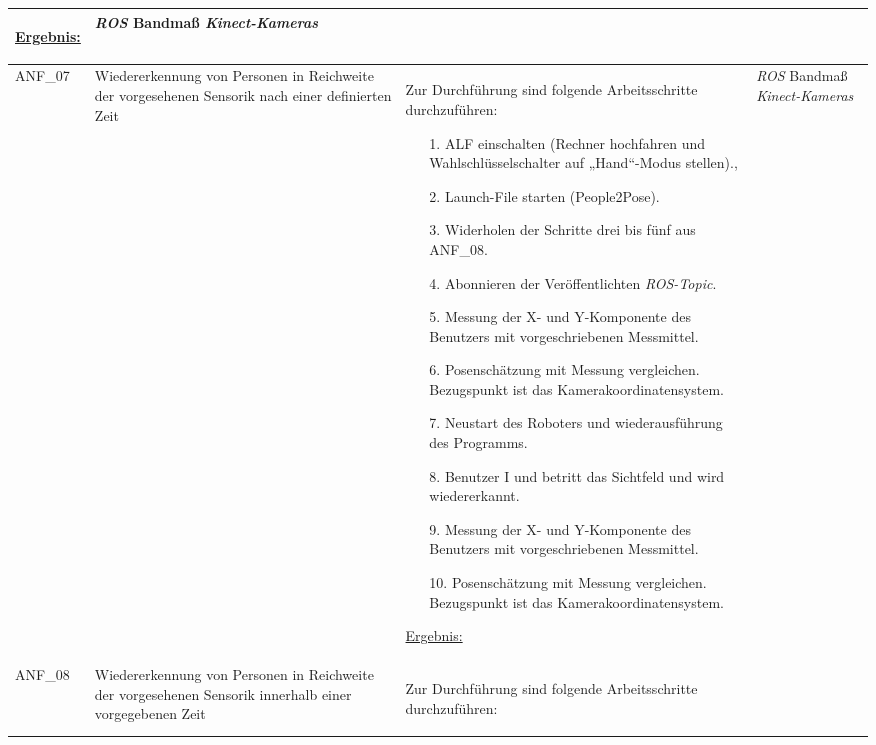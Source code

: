 \documentclass[12pt,a4paper,oneside,numbers=noenddot,captions=tableheading,toc=bibliography,openany,tikz,margin=5mm]{scrbook}
\begin{document}
\begin{longtable}{|p{}|p{}|p{7cm}|p{}|}
\begin{itemize}
\end{itemize}

\underline{Ergebnis:}\newline
\newline

\textbf{}	%
& \textit{ROS}\newline
Bandmaß\newline
\textit{Kinect-Kameras}
\\
\hline

ANF\_07 & Wiedererkennung von Personen in Reichweite der vorgesehenen Sensorik nach einer definierten Zeit & Zur Durchführung sind folgende Arbeitsschritte durchzuführen:
\begin{itemize}
	\item[1.]	ALF einschalten (Rechner hochfahren und Wahlschlüsselschalter auf „Hand“-Modus stellen).,
	\item[2.]	Launch-File starten (People2Pose).
	\item[3.]	Widerholen der Schritte drei bis fünf aus ANF\_08.
	\item[4.]	Abonnieren der Veröffentlichten \textit{ROS-Topic}. 
	\item[5.]	Messung der X- und Y-Komponente des Benutzers mit vorgeschriebenen Messmittel.
	\item[6.]	Posenschätzung mit Messung vergleichen. Bezugspunkt ist das Kamerakoordinatensystem.
	\item[7.]	Neustart des Roboters und wiederausführung des Programms.
	\item[8.]	Benutzer I und betritt das Sichtfeld und wird wiedererkannt.
	\item[9.]	Messung der X- und Y-Komponente des Benutzers mit vorgeschriebenen Messmittel.
	\item[10.]	Posenschätzung mit Messung vergleichen. Bezugspunkt ist das Kamerakoordinatensystem.
	
\end{itemize}

\underline{Ergebnis:}\newline
\newline

\textbf{}%
& \textit{ROS}\newline
Bandmaß\newline
\textit{Kinect-Kameras}
\\
	\hline
	ANF\_08 & Wiedererkennung von Personen in Reichweite der vorgesehenen Sensorik innerhalb einer vorgegebenen Zeit & Zur Durchführung sind folgende Arbeitsschritte durchzuführen:
	\begin{itemize}
		

\end{itemize}
\end{longtable}
\end{document}
